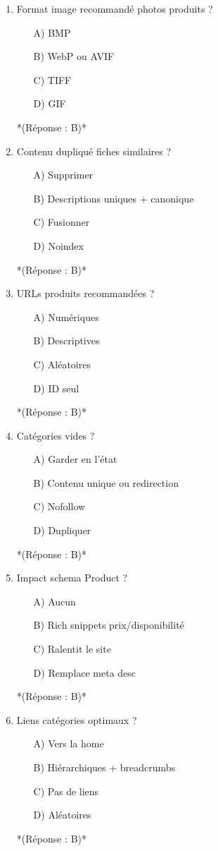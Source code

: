 \documentclass[12pt,a4paper,twoside]{report}
\begin{document}
\begin{enumerate}
\item Format image recommandé photos produits ?
\begin{itemize}
\item[A)] BMP
\item[B)] WebP ou AVIF
\item[C)] TIFF
\item[D)] GIF
\end{itemize}
*(Réponse : B)*

\item Contenu dupliqué fiches similaires ?
\begin{itemize}
\item[A)] Supprimer
\item[B)] Descriptions uniques + canonique
\item[C)] Fusionner
\item[D)] Noindex
\end{itemize}
*(Réponse : B)*

\item URLs produits recommandées ?
\begin{itemize}
\item[A)] Numériques
\item[B)] Descriptives
\item[C)] Aléatoires
\item[D)] ID seul
\end{itemize}
*(Réponse : B)*

\item Catégories vides ?
\begin{itemize}
\item[A)] Garder en l'état
\item[B)] Contenu unique ou redirection
\item[C)] Nofollow
\item[D)] Dupliquer
\end{itemize}
*(Réponse : B)*

\item Impact schema Product ?
\begin{itemize}
\item[A)] Aucun
\item[B)] Rich snippets prix/disponibilité
\item[C)] Ralentit le site
\item[D)] Remplace meta desc
\end{itemize}
*(Réponse : B)*

\item Liens catégories optimaux ?
\begin{itemize}
\item[A)] Vers la home
\item[B)] Hiérarchiques + breadcrumbs
\item[C)] Pas de liens
\item[D)] Aléatoires
\end{itemize}
*(Réponse : B)*


\end{enumerate}
\end{document}

